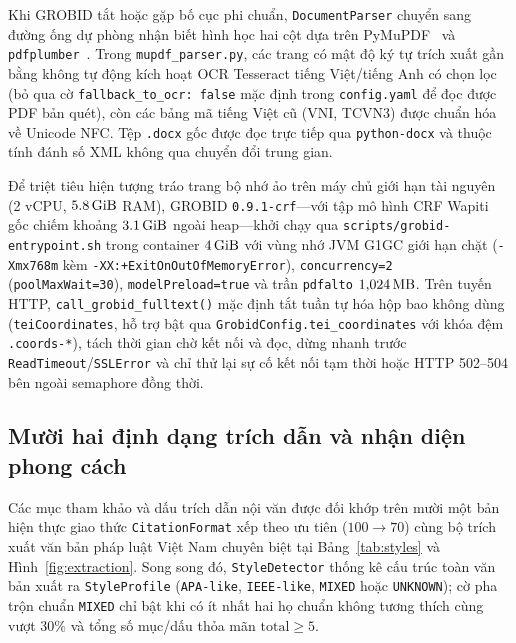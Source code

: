 Khi GROBID tắt hoặc gặp bố cục phi chuẩn, \texttt{DocumentParser} chuyển sang đường ống dự phòng nhận biết hình học hai cột dựa trên PyMuPDF~\cite{PyMuPDF2024} và \texttt{pdfplumber}~\cite{Pdfplumber2024}. Trong \texttt{mupdf\_parser.py}, các trang có mật độ ký tự trích xuất gần bằng không tự động kích hoạt OCR Tesseract tiếng Việt/tiếng Anh có chọn lọc (bỏ qua cờ \texttt{fallback\_to\_ocr: false} mặc định trong \texttt{config.yaml} để đọc được PDF bản quét), còn các bảng mã tiếng Việt cũ (VNI, TCVN3) được chuẩn hóa về Unicode NFC. Tệp \texttt{.docx} gốc được đọc trực tiếp qua \texttt{python-docx} và thuộc tính đánh số XML không qua chuyển đổi trung gian.

Để triệt tiêu hiện tượng tráo trang bộ nhớ ảo trên máy chủ giới hạn tài nguyên (2 vCPU, $5.8\text{\,GiB}$ RAM), GROBID \texttt{0.9.1-crf}---với tập mô hình CRF Wapiti gốc chiếm khoảng $3.1\text{\,GiB}$ ngoài heap---khởi chạy qua \texttt{scripts/\allowbreak{}grobid-entrypoint.sh} trong container $4\text{\,GiB}$ với vùng nhớ JVM G1GC giới hạn chặt (\texttt{-Xmx768m} kèm \texttt{-XX:+ExitOnOutOfMemoryError}), \texttt{concurrency=2} (\texttt{poolMaxWait=30}), \texttt{modelPreload=true} và trần \texttt{pdfalto} $1{,}024\text{\,MB}$. Trên tuyến HTTP, \texttt{call\_grobid\_fulltext()} mặc định tắt tuần tự hóa hộp bao không dùng (\texttt{teiCoordinates}, hỗ trợ bật qua \texttt{GrobidConfig.tei\_coordinates} với khóa đệm \texttt{.coords-*}), tách thời gian chờ kết nối và đọc, dừng nhanh trước \texttt{ReadTimeout}/\texttt{SSLError} và chỉ thử lại sự cố kết nối tạm thời hoặc HTTP 502--504 bên ngoài semaphore đồng thời.

\subsection{Mười hai định dạng trích dẫn và nhận diện phong cách}

Các mục tham khảo và dấu trích dẫn nội văn được đối khớp trên mười một bản hiện thực giao thức \texttt{CitationFormat} xếp theo ưu tiên ($100 \rightarrow 70$) cùng bộ trích xuất văn bản pháp luật Việt Nam chuyên biệt tại Bảng~\ref{tab:styles} và Hình~\ref{fig:extraction}. Song song đó, \texttt{StyleDetector} thống kê cấu trúc toàn văn bản xuất ra \texttt{StyleProfile} (\texttt{APA-like}, \texttt{IEEE-like}, \texttt{MIXED} hoặc \texttt{UNKNOWN}); cờ pha trộn chuẩn \texttt{MIXED} chỉ bật khi có ít nhất hai họ chuẩn không tương thích cùng vượt $30\%$ và tổng số mục/dấu thỏa mãn $\text{total} \ge 5$.


